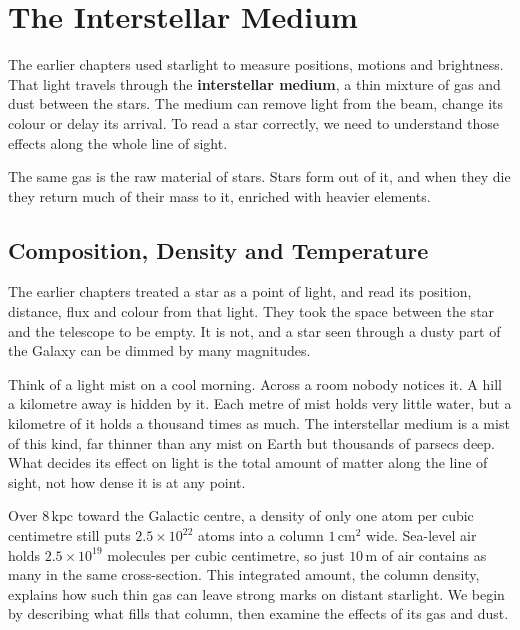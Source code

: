 \chapter{The Interstellar Medium}
\label{ch:ism}



The earlier chapters used starlight to measure positions, motions and brightness. That light travels through the \textbf{interstellar medium}, a thin mixture of gas and dust between the stars. The medium can remove light from the beam, change its colour or delay its arrival. To read a star correctly, we need to understand those effects along the whole line of sight.

The same gas is the raw material of stars. Stars form out of it, and when they die they return much of their mass to it, enriched with heavier elements.

\section{Composition, Density and Temperature}
\label{is:sec:composition}

The earlier chapters treated a star as a point of light, and read its position, distance, flux and colour from that light. They took the space between the star and the telescope to be empty. It is not, and a star seen through a dusty part of the Galaxy can be dimmed by many magnitudes.

Think of a light mist on a cool morning. Across a room nobody notices it. A hill a kilometre away is hidden by it. Each metre of mist holds very little water, but a kilometre of it holds a thousand times as much. The interstellar medium is a mist of this kind, far thinner than any mist on Earth but thousands of parsecs deep. What decides its effect on light is the total amount of matter along the line of sight, not how dense it is at any point.

Over $8\,\mathrm{kpc}$ toward the Galactic centre, a density of only one atom per cubic centimetre still puts $2.5\times10^{22}$ atoms into a column $1\,\mathrm{cm^2}$ wide. Sea-level air holds $2.5\times10^{19}$ molecules per cubic centimetre, so just $10\,\mathrm m$ of air contains as many in the same cross-section. This integrated amount, the column density, explains how such thin gas can leave strong marks on distant starlight. We begin by describing what fills that column, then examine the effects of its gas and dust.

